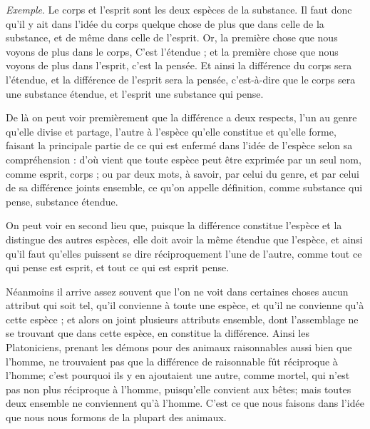 \emph{Exemple}. Le corps et l'esprit sont les deux espèces de la substance. Il faut donc qu'il y ait dans l'idée du corps quelque chose de plus que dans celle de la substance, et de même dans celle de l'esprit. Or, la première chose que nous voyons de plus dans le corps, C'est l'étendue ; et la première chose que nous voyons de plus dans l'esprit, c'est la pensée. Et ainsi la différence du corps sera l'étendue, et la différence de l'esprit sera la pensée, c'est-à-dire que le corps sera une substance étendue, et l'esprit une substance qui pense.

De là on peut voir premièrement que la différence a deux respects, l'un au genre qu'elle divise et partage, l'autre à l'espèce qu'elle constitue et qu'elle forme, faisant la principale partie de ce qui est enfermé dans l'idée de l'espèce selon sa compréhension : d'où vient que toute espèce peut être exprimée par un seul nom, comme esprit, corps ; ou par deux mots, à savoir, par celui du genre, et par celui de sa différence joints ensemble, ce qu'on appelle définition, comme substance qui pense, substance étendue.

On peut voir en second lieu que, puisque la différence constitue l'espèce et la distingue des autres espèces, elle doit avoir la même étendue que l'espèce, et ainsi qu'il faut qu'elles puissent se dire réciproquement l'une de l'autre, comme tout ce qui pense est esprit, et tout ce qui est esprit pense.

Néanmoins il arrive assez souvent que l'on ne voit dans certaines choses aucun attribut qui soit tel, qu'il convienne à toute une espèce, et qu'il ne convienne qu'à cette espèce ; et alors on joint plusieurs attributs ensemble, dont l'assemblage ne se trouvant que dans cette espèce, en constitue la différence. Ainsi les Platoniciens, prenant les démons pour des animaux raisonnables aussi bien que l'homme, ne trouvaient pas que la différence de raisonnable fût réciproque à l'homme; c'est pourquoi ils y en ajoutaient une autre, comme mortel, qui n'est pas non plus réciproque à l'homme, puisqu'elle convient aux bêtes; mais toutes deux ensemble ne conviennent qu'à l'homme. C'est ce que nous faisons dans l'idée que nous nous formons de la plupart des animaux.

